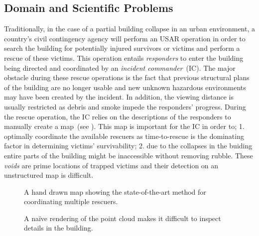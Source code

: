 \subsection{Domain and Scientific Problems} \label{contributions:usar:background}
Traditionally, in the case of a partial building collapse in an urban environment, a country's civil contingency agency will perform an USAR operation in order to search the building for potentially injured survivors or victims and perform a rescue of these victims.  This operation entails \emph{responders} to enter the building being directed and coordinated by an \emph{incident commander}~(IC).  The major obstacle during these rescue operations is the fact that previous structural plans of the building are no longer usable and new unknown hazardous environments may have been created by the incident.  In addition, the viewing distance is usually restricted as debris and smoke impede the responders' progress.  During the rescue operation, the IC relies on the descriptions of the responders to manually create a map~(see ).  This map is important for the IC in order to; 1. optimally coordinate the available rescuers as time-to-rescue is the dominating factor in determining victims' survivability; 2. due to the collapses in the buiding entire parts of the building might be inaccessible without removing rubble.  These \emph{voids} are prime locations of trapped victims and their detection on an unstructured  map is difficult.

\begin{figure}
\centering
{}
\caption{A hand drawn map showing the state-of-the-art method for coordinating multiple rescuers.}
\label{contributions:usar:map:hand}
\end{figure}

\begin{figure}
\centering
{}
\caption{A na\"ive rendering of the point cloud makes it difficult to inspect details in the building.}
\label{contributions:usar:map:pointcloud}
\end{figure}


